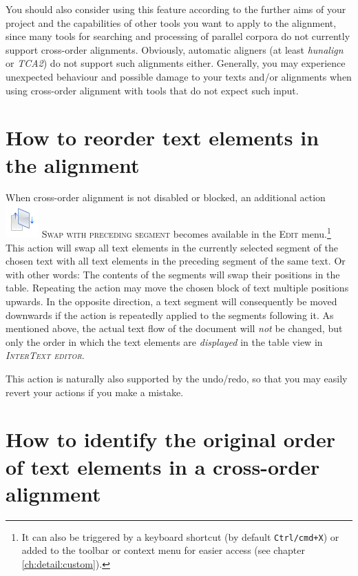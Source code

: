 \documentclass[a4paper,10pt,oneside]{book}
\newcommand{\ITeditor}{\textit{\textsc{InterText editor}}\xspace}
\newcommand{\keys}[1]{\texttt{#1}}
\newcommand{\menu}[1]{\textsc{#1}}
\begin{document}
You should also consider using this feature according to the further aims of your project and the capabilities of other tools you want to apply to the alignment, since many tools for searching and processing of parallel corpora do not currently support cross-order alignments. Obviously, automatic aligners (at least \emph{hunalign} or \emph{TCA2}) do not support such alignments either. Generally, you may experience unexpected behaviour and possible damage to your texts and/or alignments when using cross-order alignment with tools that do not expect such input.

\section{How to reorder text elements in the alignment}\label{ch:detail:crossorder:swap}

When cross-order alignment is not disabled or blocked, an additional action \includegraphics[height=2ex]{../images/48/swap.png} \menu{Swap with preceding segment} becomes available in the \menu{Edit} menu.\footnote{It can also be triggered by a keyboard shortcut (by default \keys{Ctrl/cmd+X}) or added to the toolbar or context menu for easier access (see chapter \ref{ch:detail:custom}).} This action will swap all text elements in the currently selected segment of the chosen text with all text elements in the preceding segment of the same text. Or with other words: The contents of the segments will swap their positions in the table. Repeating the action may move the chosen block of text multiple positions upwards. In the opposite direction, a text segment will consequently be moved downwards if the action is repeatedly applied to the segments following it. As mentioned above, the actual text flow of the document will \emph{not} be changed, but only the order in which the text elements are \emph{displayed} in the table view in \ITeditor.

This action is naturally also supported by the undo/redo, so that you may easily revert your actions if you make a mistake.

\section[How to identify the original order]{How to identify the original order of text elements in a cross-order alignment}\label{ch:detail:crossorder:visualization}
\end{document}
